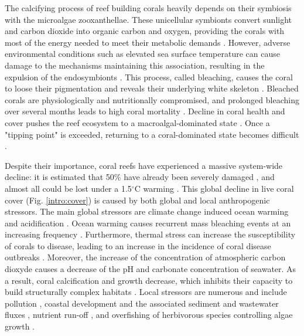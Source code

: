 The calcifying process of reef building corals heavily depends on their symbiosis with the microalgae zooxanthellae. These unicellular symbionts convert sunlight and carbon dioxide into organic carbon and oxygen, providing the corals with most of the energy needed to meet their metabolic demands \citep{muscatine1977reef}. However, adverse environmental conditions such as elevated sea surface temperature can cause damage to the mechanisms maintaining this association, resulting in the expulsion of the endosymbionts \citep{hoegh2007coral,van2022global}. This process, called bleaching, causes the coral to loose their pigmentation and reveals their underlying white skeleton \citep{baker2008climate}. Bleached corals are physiologically and nutritionally compromised, and prolonged bleaching over several months leads to high coral mortality \citep{hughes2018spatial}. Decline in coral health and cover pushes the reef ecosystem to a macroalgal-dominated state \citep{hughes2003climate,mumby2007thresholds}. Once a "tipping point" is exceeded, returning to a coral-dominated state becomes difficult \citep{mumby2007thresholds,graham2015predicting}.

Despite their importance, coral reefs have experienced a massive system-wide decline: it is estimated  that 50\% have already been severely damaged \citep{hoegh2019people}, and almost all could be lost under a 1.5$^\circ$C warming \citep{dixon2022future}. This global decline in live coral cover \citep{gardner2003long,pandolfi2003global,pandolfi2011projecting,perry2013caribbean,dietzel2021population} (Fig. \ref{intro:cover}) is caused by both global and local anthropogenic stressors. The main global stressors are climate change induced ocean warming and acidification \citep{dove2020ocean,figueiredo2021global,dixon2022future}. Ocean warming causes recurrent mass bleaching events at an increasing frequency \citep{connell199730, hughes2018spatial,van2022global}. Furthermore, thermal stress can increase the susceptibility of corals to disease, leading to an increase in the incidence of coral disease outbreaks \citep{harvell2002climate,bruno2007thermal,muller2012caribbean,howells2020annual}. Moreover, the increase of the concentration of atmospheric carbon dioxyde causes a decrease of the pH and carbonate concentration of seawater. As a result, coral calcification and growth decrease, which inhibits their capacity to build structurally complex habitats \citep{hoegh2007coral,albright2016reversal}. Local stressors are numerous and include pollution \citep{loya1980effects,van2011chemical}, coastal development and the associated sediment and wastewater fluxes \citep{erftemeijer2012environmental, jones2015effects,jones2019sedimentcunning2019extensive}, nutrient run-off \citep{hughes2003climate,fabricius2005effects}, and overfishing of herbivorous species controlling algae growth \citep{jackson2001historical,shantz2020overfishing}.

